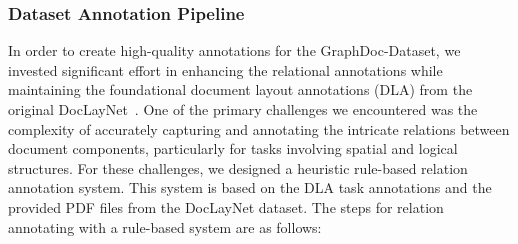 \subsubsection{Dataset Annotation Pipeline}
\label{pipeline}
In order to create high-quality annotations for the GraphDoc-Dataset, we invested significant effort in enhancing the relational annotations while maintaining the foundational document layout annotations (DLA) from the original DocLayNet~\citep{doclaynet2022}. One of the primary challenges we encountered was the complexity of accurately capturing and annotating the intricate relations between document components, particularly for tasks involving spatial and logical structures. For these challenges, we designed a heuristic rule-based relation annotation system. This system is based on the DLA task annotations and the provided PDF files from the DocLayNet dataset. The steps for relation annotating with a rule-based system are as follows:
